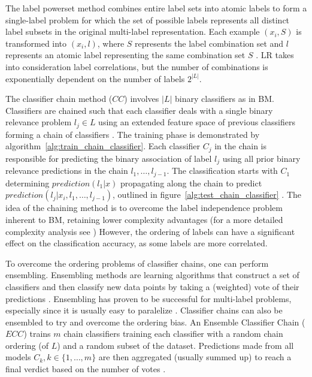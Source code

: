 The label powerset method combines entire label sets into atomic labels 
to form a single-label problem for which the set of possible labels 
represents all distinct label subsets in the original multi-label 
representation. Each example $(x_i, S)$ is transformed into 
$(x_i, l)$, where $S$ represents the label combination set and
$l$ represents an atomic label representing the same combination set $S$
\citep{read2011classifier}. LR takes into 
consideration label correlations, but the number of combinations
is exponentially dependent on the number of labels $2^{|L|}$. 

The classifier chain method ($CC$) involves $|L|$ binary classifiers as in BM. 
Classifiers are chained such that each classifier deals with 
a single binary relevance problem $l_j \in L$ using an extended feature space of 
previous classifiers 
forming a chain of classifiers \citep{read2011classifier}.
The training phase is demonstrated by algorithm~\ref{alg:train_chain_classifier}. 
Each classifier $C_j$ in the chain is responsible for predicting 
the binary association of label $l_j$ using all prior 
binary relevance predictions in the chain $l_1, \dots, l_{j - 1}$.
The classification starts with $C_1$ determining 
$prediction(l_1 | x)$ propagating along the chain
to predict $prediction(l_j | x_i, l_1, \dots, l_{j-1})$, outlined 
in figure~\ref{alg:test_chain_classifier}
\citep{read2011classifier}.
The idea of the chaining method is to overcome the label independence problem
inherent to BM, retaining lower complexity advantages
(for a more detailed complexity analysis see \citep{read2011classifier}) 
However, the ordering of labels can have a significant effect on 
the classification accuracy, as some labels are more correlated.

To overcome the ordering problems of classifier chains, one can perform
ensembling.  Ensembling methods are learning algorithms that construct a set of
classifiers and then classify new data points by taking a (weighted) vote of
their predictions \citep{dietterich2000ensemble}.  Ensembling has proven to be
successful for multi-label problems, especially since it is usually easy to
paralelize \citep{tsoumakas2007random}. Classifier chains can also be
ensembled to try and overcome the ordering bias. An Ensemble Classifier Chain
($ECC$) trains $m$ chain classifiers training each classifier with a random
chain ordering (of $L$) and a random subset of the dataset. Predictions made
from all models $C_k, k \in \{1, \dots, m\}$ are then aggregated (usually summed up)
to reach a final verdict based on the number of votes
\citep{dimitriadou2001voting}.

